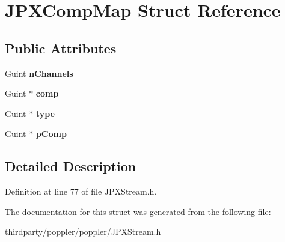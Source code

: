 \hypertarget{struct_j_p_x_comp_map}{}\section{J\+P\+X\+Comp\+Map Struct Reference}
\label{struct_j_p_x_comp_map}
\subsection*{Public Attributes}
\begin{DoxyCompactItemize}
\item 
\mbox{\label{struct_j_p_x_comp_map_a6eaa6d56b521db7dc748084594a2b2ec}} 
Guint {\bfseries n\+Channels}
\item 
\mbox{\label{struct_j_p_x_comp_map_a1c7d9d1db4d6dd5bd259b64f7919ca67}} 
Guint $\ast$ {\bfseries comp}
\item 
\mbox{\label{struct_j_p_x_comp_map_af90446107f8e633bc51a04036b5612f1}} 
Guint $\ast$ {\bfseries type}
\item 
\mbox{\label{struct_j_p_x_comp_map_ac5ffce168b65a9c4a09643a05a117fd3}} 
Guint $\ast$ {\bfseries p\+Comp}
\end{DoxyCompactItemize}


\subsection{Detailed Description}


Definition at line 77 of file J\+P\+X\+Stream.\+h.



The documentation for this struct was generated from the following file\+:\begin{DoxyCompactItemize}
\item 
thirdparty/poppler/poppler/J\+P\+X\+Stream.\+h\end{DoxyCompactItemize}
